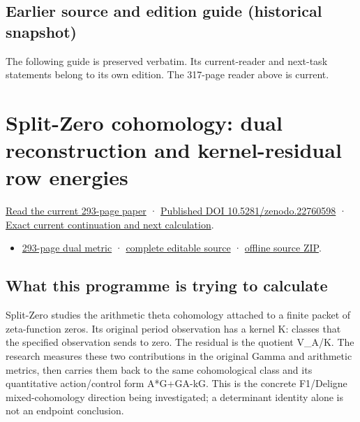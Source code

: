 \documentclass[
]{article}
\providecommand{\tightlist}{%
  \setlength{\itemsep}{0pt}\setlength{\parskip}{0pt}}
\begin{document}
\subsection{Earlier source and edition guide (historical
snapshot)}\label{earlier-source-and-edition-guide-historical-snapshot-3}

The following guide is preserved verbatim. Its current-reader and
next-task statements belong to its own edition. The 317-page reader
above is current.

\section{Split-Zero cohomology: dual reconstruction and kernel-residual
row
energies}\label{split-zero-cohomology-dual-reconstruction-and-kernel-residual-row-energies}

\href{https://zenodo.org/api/records/22760598/files/65-dual-metric-reader.pdf/content}{Read
the current 293-page paper} ·
\href{https://doi.org/10.5281/zenodo.22760598}{Published DOI
10.5281/zenodo.22760598} ·
\href{https://github.com/KokunoYumeto/zeta-function-research-reader/blob/b4076eb15afd6b036a8de62d67b88eef03efeb50/workbenches/splitzero-tandem/continuations/20260915-dual-metric-continuation/00_CONTINUE_HERE.md}{Exact
current continuation and next calculation}.

\begin{itemize}
\tightlist
\item
  \href{https://zenodo.org/api/records/22760598/files/65-dual-metric-reader.pdf/content}{293-page
  dual metric} ·
  \href{https://github.com/KokunoYumeto/zeta-function-research-reader/tree/b4076eb15afd6b036a8de62d67b88eef03efeb50/workbenches/splitzero-tandem/continuations/20260915-dual-metric-continuation}{complete
  editable source} ·
  \href{https://zenodo.org/api/records/22760598/files/66-dual-metric-sources.zip/content}{offline
  source ZIP}.
\end{itemize}

\subsection{What this programme is trying to
calculate}\label{what-this-programme-is-trying-to-calculate}

Split-Zero studies the arithmetic theta cohomology attached to a finite
packet of zeta-function zeros. Its original period observation has a
kernel K: classes that the specified observation sends to zero. The
residual is the quotient V\_A/K. The research measures these two
contributions in the original Gamma and arithmetic metrics, then carries
them back to the same cohomological class and its quantitative
action/control form A*G+GA-kG. This is the concrete F1/Deligne
mixed-cohomology direction being investigated; a determinant identity
alone is not an endpoint conclusion.
\end{document}
